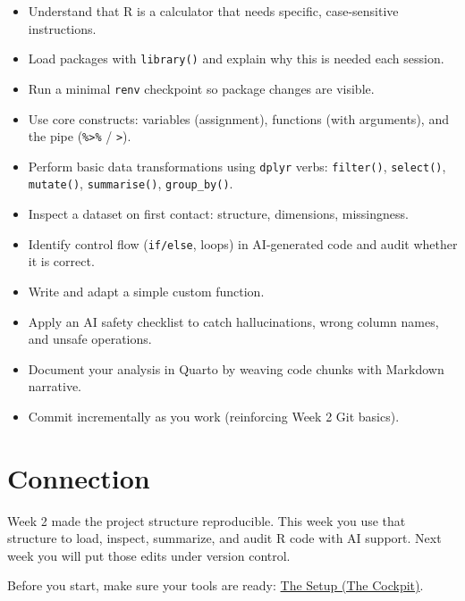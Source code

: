 \documentclass[
  letterpaper,
  DIV=11,
  numbers=noendperiod,
  oneside]{scrreprt}
\providecommand{\tightlist}{%
  \setlength{\itemsep}{0pt}\setlength{\parskip}{0pt}}
\begin{document}
\begin{itemize}
\tightlist
\item
  Understand that R is a calculator that needs specific, case-sensitive
  instructions.
\item
  Load packages with \texttt{library()} and explain why this is needed
  each session.
\item
  Run a minimal \texttt{renv} checkpoint so package changes are visible.
\item
  Use core constructs: variables (assignment), functions (with
  arguments), and the pipe (\texttt{\%\textgreater{}\%} /
  \texttt{\textbar{}\textgreater{}}).
\item
  Perform basic data transformations using \texttt{dplyr} verbs:
  \texttt{filter()}, \texttt{select()}, \texttt{mutate()},
  \texttt{summarise()}, \texttt{group\_by()}.
\item
  Inspect a dataset on first contact: structure, dimensions,
  missingness.
\item
  Identify control flow (\texttt{if/else}, loops) in AI-generated code
  and audit whether it is correct.
\item
  Write and adapt a simple custom function.
\item
  Apply an AI safety checklist to catch hallucinations, wrong column
  names, and unsafe operations.
\item
  Document your analysis in Quarto by weaving code chunks with Markdown
  narrative.
\item
  Commit incrementally as you work (reinforcing Week 2 Git basics).
\end{itemize}

\section*{Connection}\label{connection-2}


Week 2 made the project structure reproducible. This week you use that
structure to load, inspect, summarize, and audit R code with AI support.
Next week you will put those edits under version control.

Before you start, make sure your tools are ready:
\href{r01-setup.qmd}{The Setup (The Cockpit)}.
\end{document}

